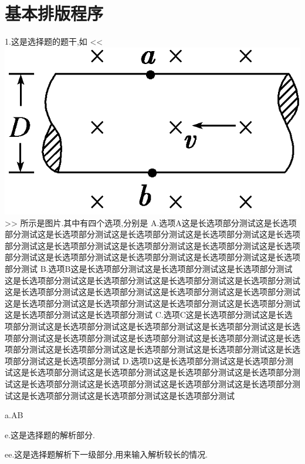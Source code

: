 \documentclass[a4paper,fontset = windowsnew]{ctexbook}
\begin{document}
\chapter{基本排版程序}



\begin{choices}
  1.这是选择题的题干,如
  <<
  \includegraphics{1.png}
  >>
  所示是图片.其中有四个选项,分别是
  A.选项A这是长选项部分测试这是长选项部分测试这是长选项部分测试这是长选项部分测试这是长选项部分测试这是长选项部分测试这是长选项部分测试这是长选项部分测试这是长选项部分测试这是长选项部分测试这是长选项部分测试这是长选项部分测试这是长选项部分测试这是长选项部分测试
  B.选项B这是长选项部分测试这是长选项部分测试这是长选项部分测试这是长选项部分测试这是长选项部分测试这是长选项部分测试这是长选项部分测试这是长选项部分测试这是长选项部分测试这是长选项部分测试这是长选项部分测试这是长选项部分测试这是长选项部分测试这是长选项部分测试这是长选项部分测试这是长选项部分测试这是长选项部分测试
  C.选项C这是长选项部分测试这是长选项部分测试这是长选项部分测试这是长选项部分测试这是长选项部分测试这是长选项部分测试这是长选项部分测试这是长选项部分测试这是长选项部分测试这是长选项部分测试这是长选项部分测试这是长选项部分测试这是长选项部分测试这是长选项部分测试这是长选项部分测试
  D.选项D这是长选项部分测试这是长选项部分测试这是长选项部分测试这是长选项部分测试这是长选项部分测试这是长选项部分测试这是长选项部分测试这是长选项部分测试这是长选项部分测试这是长选项部分测试这是长选项部分测试这是长选项部分测试这是长选项部分测试

  a.AB

  e.这是选择题的解析部分.

  ee.这是选择题解析下一级部分,用来输入解析较长的情况.


\end{choices}
\end{document}

